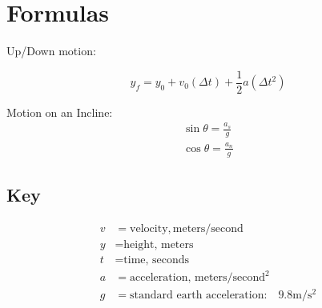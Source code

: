 \documentclass[../Notes.tex]{subfiles}
\begin{document}
    \section{Formulas}
    \begin{center}
        Up/Down motion:


        \begin{equation}
            \label{eqn::yfinal}
            y_{f} = y_{0} + v_{0}(\Delta t) + \frac{1}{2}a(\Delta t^{2})
        \end{equation}

        Motion on an Incline:
        \begin{equation}
            \begin{gathered}
                \sin \theta = \frac{a_s}{g} \\
                \cos \theta = \frac{a_n}{g}        
            \end{gathered}
        \end{equation}
    \end{center}

    \subsection{Key}

    \begin{align*}
        v & = \text{velocity}, \text{meters} / \text{second}        \\
        y & = \text{height, meters}                                 \\
        t & = \text{time, seconds}                                  \\
        a & = \text{acceleration, } \text{meters} / \text{second}^2 \\
        g & = \text{standard earth acceleration:} \quad 9.8 \text{m} / \text{s}^2
    \end{align*}
\end{document}
